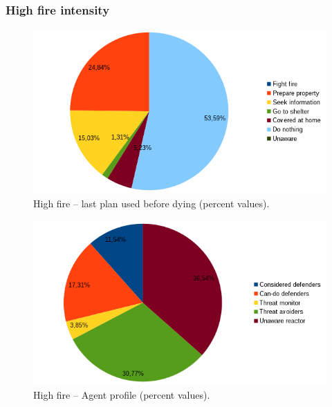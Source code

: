 \documentclass[12pt, a4paper]{memoir} %
\begin{document}
		\subsubsection{High fire intensity}

		\begin{figure}
			\begin{center}
				\includegraphics[scale=0.6]{high-lastplan.png}
				\caption{\label{fig:high-lastplan}High fire \--- last plan used before dying (percent values).}
			\end{center}
		\end{figure}

		\begin{figure}
			\begin{center}
				\includegraphics[scale=0.6]{high-profil.png}
				\caption{\label{fig:high-profil}High fire \--- Agent profile (percent values).}
			\end{center}
		\end{figure}
\end{document}
